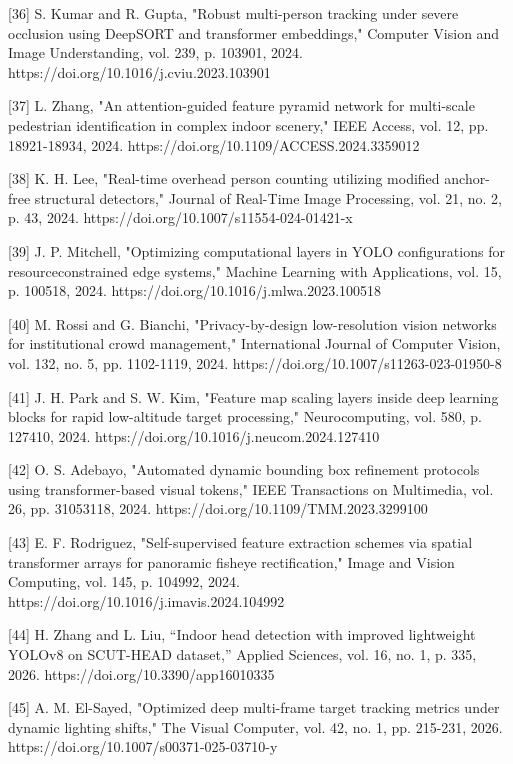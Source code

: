 [36] S. Kumar and R. Gupta, "Robust multi-person tracking under severe occlusion using
DeepSORT and transformer embeddings," Computer Vision and Image Understanding,
vol. 239, p. 103901, 2024. https://doi.org/10.1016/j.cviu.2023.103901

[37] L. Zhang, "An attention-guided feature pyramid network for multi-scale pedestrian
identification in complex indoor scenery," IEEE Access, vol. 12, pp. 18921-18934, 2024.
https://doi.org/10.1109/ACCESS.2024.3359012

[38] K. H. Lee, "Real-time overhead person counting utilizing modified anchor-free
structural detectors," Journal of Real-Time Image Processing, vol. 21, no. 2, p. 43, 2024.
https://doi.org/10.1007/s11554-024-01421-x

[39] J. P. Mitchell, "Optimizing computational layers in YOLO configurations for resourceconstrained edge systems," Machine Learning with Applications, vol. 15, p. 100518, 2024.
https://doi.org/10.1016/j.mlwa.2023.100518

[40] M. Rossi and G. Bianchi, "Privacy-by-design low-resolution vision networks for
institutional crowd management," International Journal of Computer Vision, vol. 132, no.
5, pp. 1102-1119, 2024. https://doi.org/10.1007/s11263-023-01950-8

[41] J. H. Park and S. W. Kim, "Feature map scaling layers inside deep learning blocks for
rapid low-altitude target processing," Neurocomputing, vol. 580, p. 127410, 2024.
https://doi.org/10.1016/j.neucom.2024.127410




[42] O. S. Adebayo, "Automated dynamic bounding box refinement protocols using
transformer-based visual tokens," IEEE Transactions on Multimedia, vol. 26, pp. 31053118, 2024. https://doi.org/10.1109/TMM.2023.3299100

[43] E. F. Rodriguez, "Self-supervised feature extraction schemes via spatial transformer
arrays for panoramic fisheye rectification," Image and Vision Computing, vol. 145, p.
104992, 2024. https://doi.org/10.1016/j.imavis.2024.104992

[44] H. Zhang and L. Liu, ``Indoor head detection with improved lightweight YOLOv8 on
SCUT-HEAD dataset,'' Applied Sciences, vol. 16, no. 1, p. 335, 2026.
https://doi.org/10.3390/app16010335

[45] A. M. El-Sayed, "Optimized deep multi-frame target tracking metrics under dynamic
lighting shifts," The Visual Computer, vol. 42, no. 1, pp. 215-231, 2026.
https://doi.org/10.1007/s00371-025-03710-y

